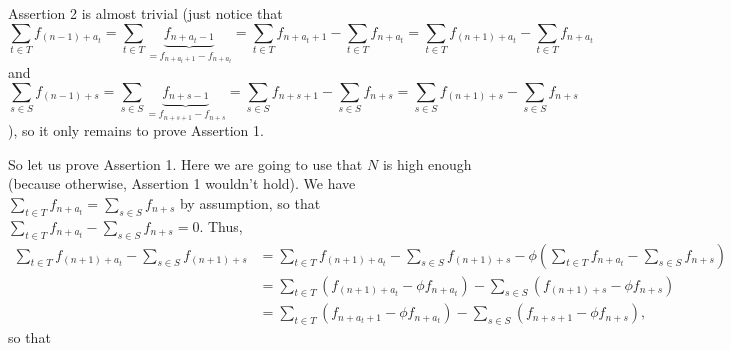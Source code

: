 \documentclass[12pt,final,notitlepage,onecolumn]{article}%
\begin{document}
Assertion 2 is almost trivial (just notice that%
\[
\sum\limits_{t\in T}f_{\left(  n-1\right)  +a_{t}}=\sum\limits_{t\in
T}\underbrace{f_{n+a_{t}-1}}_{=f_{n+a_{t}+1}-f_{n+a_{t}}}=\sum\limits_{t\in
T}f_{n+a_{t}+1}-\sum\limits_{t\in T}f_{n+a_{t}}=\sum\limits_{t\in T}f_{\left(
n+1\right)  +a_{t}}-\sum\limits_{t\in T}f_{n+a_{t}}%
\]
and%
\[
\sum\limits_{s\in S}f_{\left(  n-1\right)  +s}=\sum\limits_{s\in
S}\underbrace{f_{n+s-1}}_{=f_{n+s+1}-f_{n+s}}=\sum\limits_{s\in S}%
f_{n+s+1}-\sum\limits_{s\in S}f_{n+s}=\sum\limits_{s\in S}f_{\left(
n+1\right)  +s}-\sum\limits_{s\in S}f_{n+s}%
\]
), so it only remains to prove Assertion 1.

So let us prove Assertion 1. Here we are going to use that $N$ is high enough
(because otherwise, Assertion 1 wouldn't hold). We have $\sum\limits_{t\in
T}f_{n+a_{t}}=\sum\limits_{s\in S}f_{n+s}$ by assumption, so that
$\sum\limits_{t\in T}f_{n+a_{t}}-\sum\limits_{s\in S}f_{n+s}=0$. Thus,%
\begin{align*}
\sum\limits_{t\in T}f_{\left(  n+1\right)  +a_{t}}-\sum\limits_{s\in
S}f_{\left(  n+1\right)  +s}  &  =\sum\limits_{t\in T}f_{\left(  n+1\right)
+a_{t}}-\sum\limits_{s\in S}f_{\left(  n+1\right)  +s}-\phi\left(
\sum\limits_{t\in T}f_{n+a_{t}}-\sum\limits_{s\in S}f_{n+s}\right) \\
&  =\sum\limits_{t\in T}\left(  f_{\left(  n+1\right)  +a_{t}}-\phi
f_{n+a_{t}}\right)  -\sum\limits_{s\in S}\left(  f_{\left(  n+1\right)
+s}-\phi f_{n+s}\right) \\
&  =\sum\limits_{t\in T}\left(  f_{n+a_{t}+1}-\phi f_{n+a_{t}}\right)
-\sum\limits_{s\in S}\left(  f_{n+s+1}-\phi f_{n+s}\right)  ,
\end{align*}
so that%
\end{document}
